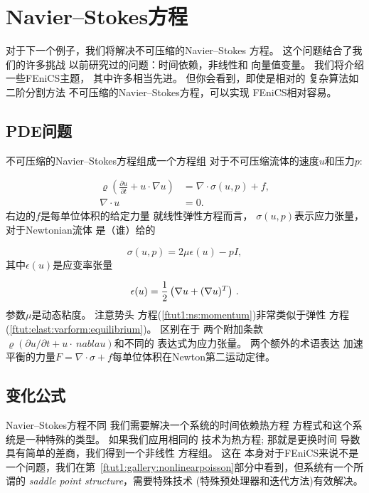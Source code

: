 \section{Navier--Stokes方程}
\label{ftut1:NS}


对于下一个例子，我们将解决不可压缩的Navier--Stokes
方程。 这个问题结合了我们的许多挑战
以前研究过的问题：时间依赖，非线性和
向量值变量。 我们将介绍一些FEniCS主题，
其中许多相当先进。 但你会看到，即使是相对的
复杂算法如二阶分割方法
不可压缩的Navier--Stokes方程，可以实现
FEniCS相对容易。

\subsection{PDE问题}

不可压缩的Navier--Stokes方程组成一个方程组
对于不可压缩流体的速度$u$和压力$p$:

\begin{align}
  \label{ftut1:ns:momentum}
  \varrho\left(\frac{\partial u}{\partial t} +
  u \cdot \nabla u\right) &= \nabla\cdot\sigma(u, p) + f, \\
  \label{ftut1:ns:continuity}
  \nabla \cdot u &= 0.
\end{align}
右边的$f$是每单位体积的给定力量
就线性弹性方程而言，
$\sigma(u,p)$表示应力张量，对于Newtonian流体
是（谁）给的


\begin{equation}
  \sigma(u, p) = 2\mu\epsilon(u) - pI,
\end{equation}
其中$\epsilon(u)$是应变率张量


\[ \epsilon(u) = \frac{1}{2}\left(\nabla u + (\nabla u)^T\right)\tp\]
参数$\mu$是动态粘度。 注意势头
方程(\ref{ftut1:ns:momentum})非常类似于弹性
方程(\ref{ftut:elast:varform:equilibrium})。 区别在于
两个附加条款$\varrho(\partial u/ \partial t + u \cdot \ nabla u)$和不同的
表达式为应力张量。 两个额外的术语表达
加速平衡的力量$F = \nabla\cdot\sigma + f$每单位体积在Newton第二运动定律。

\subsection{变化公式}
\label{ftut1:NS:varform}

Navier--Stokes方程不同
我们需要解决一个系统的时间依赖热方程
方程式和这个系统是一种特殊的类型。 如果我们应用相同的
技术为热方程; 那就是更换时间
导数具有简单的差商，我们得到一个非线性
方程组。 这在
本身对于FEniCS来说不是一个问题，我们在第~\ref{ftut1:gallery:nonlinearpoisson}部分中看到，但系统有一个所谓的
\emph{saddle point structure}，需要特殊技术
(特殊预处理器和迭代方法)有效解决。

